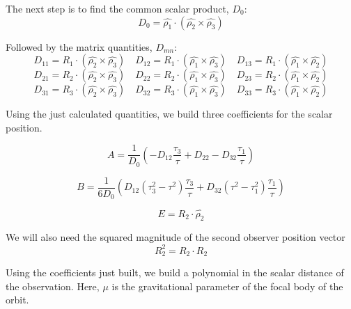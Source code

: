 \documentclass[11pt,twoside,letterpaper]{article}
\begin{document}
  The next step is to find the common scalar product, $D_0$:
  \begin{equation}
    D_0 = \hat{\rho_1}\cdot(\hat{\rho_2}\times\hat{\rho_3})
  \end{equation}

  Followed by the matrix quantities, $D_{mn}$:
  \begin{equation}
    D_{11} = R_1\cdot(\hat{\rho_2}\times\hat{\rho_3})
    \quad D_{12} = R_1\cdot(\hat{\rho_1}\times\hat{\rho_3})
    \quad D_{13} = R_1\cdot(\hat{\rho_1}\times\hat{\rho_2})
  \end{equation}
  \begin{equation}
    D_{21} = R_2\cdot(\hat{\rho_2}\times\hat{\rho_3})
    \quad D_{22} = R_2\cdot(\hat{\rho_1}\times\hat{\rho_3})
    \quad D_{23} = R_2\cdot(\hat{\rho_1}\times\hat{\rho_2})
  \end{equation}
  \begin{equation}
    D_{31} = R_3\cdot(\hat{\rho_2}\times\hat{\rho_3})
    \quad D_{32} = R_3\cdot(\hat{\rho_1}\times\hat{\rho_3})
    \quad D_{33} = R_3\cdot(\hat{\rho_1}\times\hat{\rho_2})
  \end{equation}

  Using the just calculated quantities, we build three coefficients
  for the scalar position.

  \begin{equation}
    A = \frac{1}{D_0}\left( -D_{12}\frac{\tau_3}{\tau} + D_{22} -D_{32}\frac{\tau_1}{\tau}\right)
  \end{equation}

  \begin{equation}
    B = \frac{1}{6D_0}\left( D_{12}\left(\tau_3^2 - \tau^2 \right)\frac{\tau_3}{\tau}
    + D_{32}\left(\tau^2 - \tau_1^2\right)\frac{\tau_1}{\tau} \right)
  \end{equation}

  \begin{equation}
    E = R_2\cdot\hat{\rho_2}
  \end{equation}

  We will also need the squared magnitude of the second observer position vector
  \begin{equation}
    R_2^2 = R_2\cdot R_2
  \end{equation}

  Using the coefficients just built, we build a polynomial in the
  scalar distance of the observation. Here, $\mu$ is the gravitational
  parameter of the focal body of the orbit. 
\end{document}
